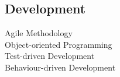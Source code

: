 \documentclass[letterpaper]{deedy-resume} %
\begin{document}
\begin{minipage}[t]{0.33\textwidth}
\sectionspace %

\subsection{Development}

Agile Methodology \\
Object-oriented Programming \\
Test-driven Development \\
Behaviour-driven Development

\sectionspace %


\end{minipage} %
\hfill
%
%
\end{document}
